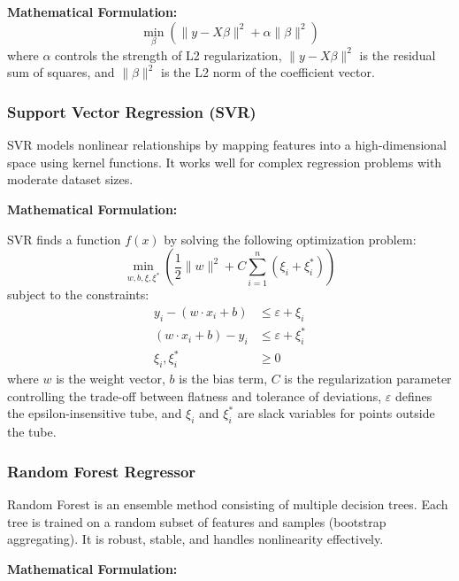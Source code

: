 \documentclass[oneside, 12pt]{book}
\numberwithin{equation}{chapter}
\begin{document}
\textbf{Mathematical Formulation:}
\begin{equation}
\min_{\beta} \left( \| y - X\beta \|^2 + \alpha \| \beta \|^2 \right)
\end{equation}
where $\alpha$ controls the strength of L2 regularization, $\| y - X\beta \|^2$ is the residual sum of squares, and $\| \beta \|^2$ is the L2 norm of the coefficient vector.

\subsubsection{Support Vector Regression (SVR)}

SVR \parencite{drucker1997svr} models nonlinear relationships by mapping features into a high-dimensional space using kernel functions. It works well for complex regression problems with moderate dataset sizes.

\textbf{Mathematical Formulation:}

SVR finds a function $f(x)$ by solving the following optimization problem:
\begin{equation}
\min_{w, b, \xi, \xi^*} \left( \frac{1}{2} \| w \|^2 + C \sum_{i=1}^{n} (\xi_i + \xi_i^*) \right)
\end{equation}
subject to the constraints:
\begin{align}
y_i - (w \cdot x_i + b) &\leq \varepsilon + \xi_i \nonumber\\
(w \cdot x_i + b) - y_i &\leq \varepsilon + \xi_i^* \nonumber\\
\xi_i, \xi_i^* &\geq 0 \nonumber
\end{align}
where $w$ is the weight vector, $b$ is the bias term, $C$ is the regularization parameter controlling the trade-off between flatness and tolerance of deviations, $\varepsilon$ defines the epsilon-insensitive tube, and $\xi_i$ and $\xi_i^*$ are slack variables for points outside the tube.

\subsubsection{Random Forest Regressor}

Random Forest \parencite{breiman2001random} is an ensemble method consisting of multiple decision trees. Each tree is trained on a random subset of features and samples (bootstrap aggregating). It is robust, stable, and handles nonlinearity effectively.

\textbf{Mathematical Formulation:}
\end{document}
